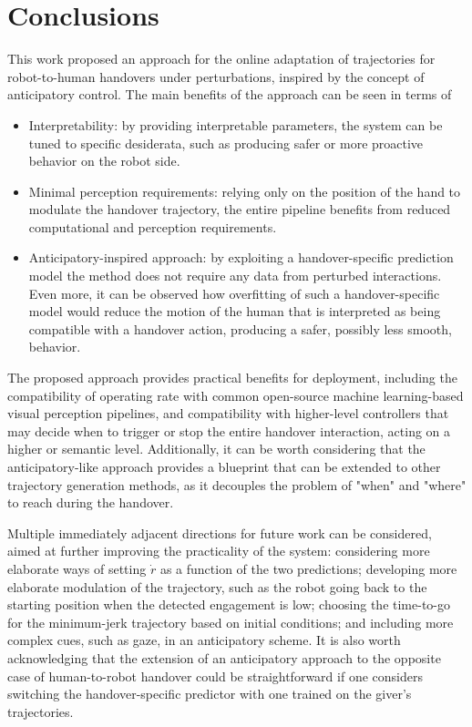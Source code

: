 \documentclass[lettersize,journal]{IEEEtran}
\begin{document}
\section{Conclusions}
\label{sec:conclusions}

\noindent
This work proposed an approach for the online adaptation of trajectories for robot-to-human handovers under perturbations, inspired by the concept of anticipatory control.
The main benefits of the approach can be seen in terms of
\begin{itemize}
	\item Interpretability: by providing interpretable parameters, the system can be tuned to specific desiderata, such as producing safer or more proactive behavior on the robot side.
	\item Minimal perception requirements: relying only on the position of the hand to modulate the handover trajectory, the entire pipeline benefits from reduced computational and perception requirements.
	\item Anticipatory-inspired approach: by exploiting a handover-specific prediction model the method does not require any data from perturbed interactions. Even more, it can be observed how overfitting of such a handover-specific model would reduce the motion of the human that is interpreted as being compatible with a handover action, producing a safer, possibly less smooth, behavior.
\end{itemize}

The proposed approach provides practical benefits for deployment, including the compatibility of operating rate with common open-source machine learning-based visual perception pipelines, and compatibility with higher-level controllers that may decide when to trigger or stop the entire handover interaction, acting on a higher or semantic level.
Additionally, it can be worth considering that the anticipatory-like approach provides a blueprint that can be extended to other trajectory generation methods, as it decouples the problem of "when" and "where" to reach during the handover.

Multiple immediately adjacent directions for future work can be considered, aimed at further improving the practicality of the system: considering more elaborate ways of setting $\dot r$ as a function of the two predictions; developing more elaborate modulation of the trajectory, such as the robot going back to the starting position when the detected engagement is low; choosing the time-to-go for the minimum-jerk trajectory based on initial conditions; and including more complex cues, such as gaze, in an anticipatory scheme.
It is also worth acknowledging that the extension of an anticipatory approach to the opposite case of human-to-robot handover could be straightforward if one considers switching the handover-specific predictor with one trained on the giver's trajectories.
\end{document}
